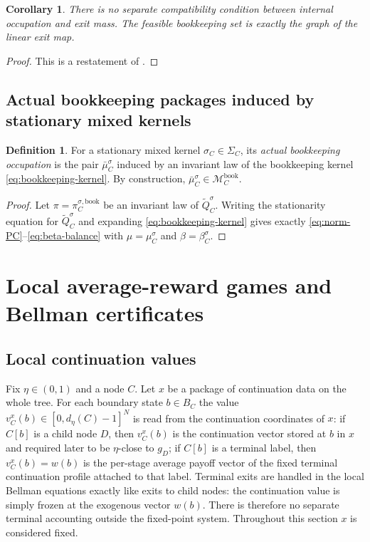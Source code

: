 \documentclass[12pt]{article}
\newtheorem{corollary}[theorem]{Corollary}
\theoremstyle{definition}
\newtheorem{definition}[theorem]{Definition}
\newcommand{\1}{\mathbf{1}}
\newcommand{\cM}{\mathcal{M}}
\begin{document}
\begin{corollary}
\label{cor:no-vp3}
There is no separate compatibility condition between internal occupation and exit
mass. The feasible bookkeeping set is exactly the graph of the linear exit map.
\end{corollary}

\begin{proof}
This is a restatement of .
\end{proof}

\subsection{Actual bookkeeping packages induced by stationary mixed kernels}

\begin{definition}
\label{def:actual-local-package}
For a stationary mixed kernel $\sigma_C\in\Sigma_C$, its \emph{actual bookkeeping
occupation} is the pair $\bar\mu_C^{\sigma}$ induced by an invariant law of the
bookkeeping kernel \eqref{eq:bookkeeping-kernel}. By construction,
$\bar\mu_C^{\sigma}\in \cM_C^{\mathrm{book}}$.
\end{definition}

\begin{proof}
Let $\pi=\pi_C^{\sigma,\mathrm{book}}$ be an invariant law of
$\widetilde Q_C^{\sigma}$. Writing the stationarity equation for
$\widetilde Q_C^{\sigma}$ and expanding \eqref{eq:bookkeeping-kernel} gives
exactly \eqref{eq:norm-PC}--\eqref{eq:beta-balance} with
$\mu=\mu_C^{\sigma}$ and $\beta=\beta_C^{\sigma}$.
\end{proof}

\section{Local average-reward games and Bellman certificates}
\label{sec:local}

\subsection{Local continuation values}

Fix $\eta\in(0,1)$ and a node $C$. Let $x$ be a package of continuation data on the
whole tree. For each boundary state $b\in B_C$ the value
$v_C^x(b)\in[0,d_\eta(C)-1]^N$ is read from the continuation coordinates of $x$:
if $C[b]$ is a child node $D$, then $v_C^x(b)$ is the continuation vector stored
at $b$ in $x$ and required later to be $\eta$-close to $g_D$; if $C[b]$ is a
terminal label, then $v_C^x(b)=w(b)$ is the per-stage average payoff vector of
the fixed terminal continuation profile attached to that label. Terminal exits
are handled in the local Bellman equations exactly like exits to child nodes:
the continuation value is simply frozen at the exogenous vector $w(b)$. There
is therefore no separate terminal accounting outside the fixed-point system.
Throughout this section $x$ is considered fixed.
\end{document}
